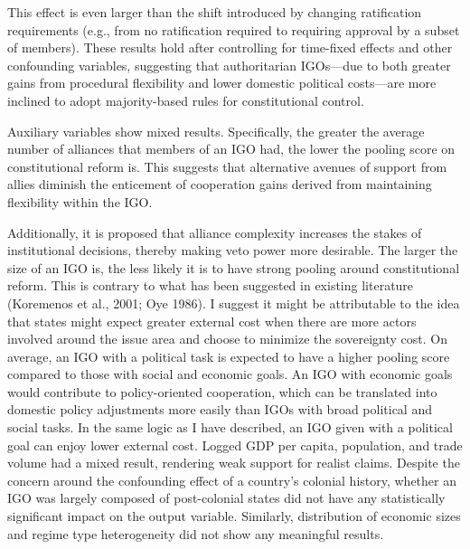 \documentclass[12pt]{article}
\begin{document}
\begin{itemize}
This effect is even larger than the shift introduced by changing ratification requirements (e.g., from no ratification required to requiring approval by a subset of members). These results hold after controlling for time-fixed effects and other confounding variables, suggesting that authoritarian IGOs—due to both greater gains from procedural flexibility and lower domestic political costs—are more inclined to adopt majority-based rules for constitutional control.



Auxiliary variables show mixed results. Specifically, the greater the average number of alliances that members of an IGO had, the lower the pooling score on constitutional reform is. This suggests that alternative avenues of support from allies diminish the enticement of cooperation gains derived from maintaining flexibility within the IGO. 

Additionally, it is proposed that alliance complexity increases the stakes of institutional decisions, thereby making veto power more desirable. The larger the size of an IGO is, the less likely it is to have strong pooling around constitutional reform. This is contrary to what has been suggested in existing literature (Koremenos et al., 2001; Oye 1986). I suggest it might be attributable to the idea that states might expect greater external cost when there are more actors involved around the issue area and choose to minimize the sovereignty cost. On average, an IGO with a political task is expected to have a higher pooling score compared to those with social and economic goals. An IGO with economic goals would contribute to policy-oriented cooperation, which can be translated into domestic policy adjustments more easily than IGOs with broad political and social tasks. In the same logic as I have described, an IGO given with a political goal can enjoy lower external cost. Logged GDP per capita, population, and trade volume had a mixed result, rendering weak support for realist claims. Despite the concern around the confounding effect of a country’s colonial history, whether an IGO was largely composed of post-colonial states did not have any statistically significant impact on the output variable. Similarly, distribution of economic sizes and regime type heterogeneity did not show any meaningful results. 



\end{itemize}
\end{document}
